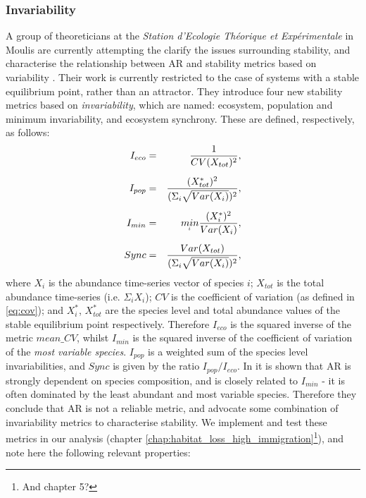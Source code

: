 \subsubsection{Invariability}
\label{sec:def_invariability}


A group of theoreticians at the \emph{Station d'Ecologie Th\'eorique et Exp\'erimentale} in Moulis are currently attempting the clarify the issues surrounding stability, and characterise the relationship between AR and stability metrics based on variability \cite{arnoldi2015,montoya2016invariability}. Their work is currently restricted to the case of systems with a stable equilibrium point, rather than an attractor. They introduce four new stability metrics based on \emph{invariability}, which are named: ecosystem, population and minimum invariability, and ecosystem synchrony. These are defined, respectively, as follows:
\begin{eqnarray}
I_{eco} &=& \frac{1}{CV(X_{tot})^2}, \\[5pt] 
I_{pop} &=& \frac{(X_{tot}^*)^2}{(\Sigma_i \sqrt{Var(X_i)})^2}, \\[5pt]
I_{min} &=& \underaccent{i}{min} \frac{(X_i^*)^2}{Var(X_i)}, \\[5pt]
Sync    &=& \frac{Var(X_{tot})}{(\Sigma_i \sqrt{Var(X_i)})^2},
\end{eqnarray}
where $X_i$ is the abundance time-series vector of species $i$; $X_{tot}$ is the total abundance time-series (i.e.  $\Sigma_i X_i$);  $CV$ is the coefficient of variation (as defined in \eqref{eq:cov}); and $X_i^*$, $X_{tot}^*$ are the species level and total abundance values of the stable equilibrium point respectively. Therefore $I_{eco}$ is the squared inverse of the metric $mean\_CV$, whilst $I_{min}$ is the squared inverse of the coefficient of variation of the \emph{most variable species}. $I_{pop}$ is a weighted sum of the species level invariabilities, and $Sync$ is given by the ratio $I_{pop} / I_{eco}$. In \cite{montoya2016invariability} it is shown that AR is strongly dependent on species composition, and is closely related to $I_{min}$ - it is often dominated by the least abundant and most variable species. Therefore they conclude that AR is not a reliable metric, and advocate some combination of invariability metrics to characterise stability. We implement and test these metrics in our analysis (chapter \ref{chap:habitat_loss_high_immigration}\footnote{And chapter 5?}), and note here the following relevant properties:

